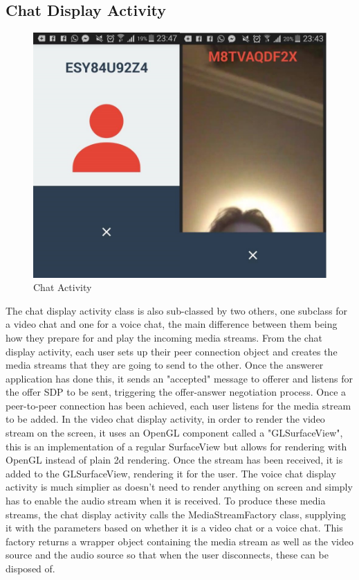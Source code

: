 \documentclass[]{report}
\begin{document}
		\subsection{Chat Display Activity}
			\begin{figure}[H]
				\caption{Chat Activity}
				\centering
				\includegraphics[scale=0.35]{ChatDisplayActivity.png}
			\end{figure}
		
		The chat display activity class is also sub-classed by two others, one subclass for a video chat and one for a voice chat, the main difference between them being how they prepare for and play the incoming media streams. From the chat display activity, each user sets up their peer connection object and creates the media streams that they are going to send to the other. Once the answerer application has done this, it sends an "accepted" message to offerer and listens for the offer SDP to be sent, triggering the offer-answer negotiation process. Once a peer-to-peer connection has been achieved, each user listens for the media stream to be added. In the video chat display activity, in order to render the video stream on the screen, it uses an OpenGL component called a "GLSurfaceView", this is an implementation of a regular SurfaceView but allows for rendering with OpenGL instead of plain 2d rendering. Once the stream has been received, it is added to the GLSurfaceView, rendering it for the user. The voice chat display activity is much simplier as doesn't need to render anything on screen and simply has to enable the audio stream when it is received. To produce these media streams, the chat display activity calls the MediaStreamFactory class, supplying it with the parameters based on whether it is a video chat or a voice chat. This factory returns a wrapper object containing the media stream as well as the video source and the audio source so that when the user disconnects, these can be disposed of.
		
\end{document}
